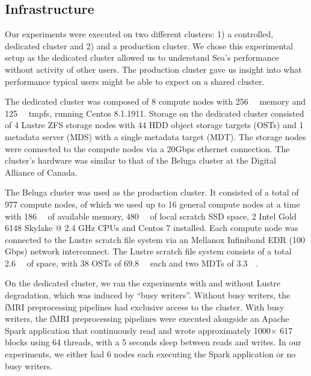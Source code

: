 \documentclass[fleqn,10pt]{wlscirep}
\begin{document}
    
    \subsection{Infrastructure}
    
    Our experiments were executed on two different clusters: 1) a controlled, dedicated cluster
    and 2) and a production cluster. We chose this experimental setup as the dedicated
    cluster allowed us to understand Sea's performance without activity of other users.
    The production cluster gave us insight into what performance typical users might
    be able to expect on a shared cluster.

    The dedicated cluster was composed of 8
    compute nodes with \SI{256}{\gibi\byte} memory and \SI{125}{\gibi\byte}
    tmpfs, running Centos 8.1.1911.
    Storage on the dedicated cluster consisted of 4 Lustre ZFS storage nodes with 44
    HDD object storage targets (OSTs) and 1 metadata server (MDS) with a single
    metadata target (MDT). The storage nodes were connected to the compute nodes
    via a 20Gbps ethernet connection. The cluster's hardware was similar to that
    of the Beluga cluster at the Digital Alliance of Canada.
    
    The Beluga cluster was used as the production cluster.
    It consisted of a total of 977 compute nodes, of which we
    used up to 16 general compute nodes at a time with \SI{186}{\gibi\byte} of
    available memory, \SI{480}{\gibi\byte} of local scratch SSD space, 2 Intel
    Gold 6148 Skylake @ 2.4 GHz CPUs and Centos 7 installed. Each compute node
    was connected to the Lustre scratch file system via an Mellanox Infiniband
    EDR (100 Gbps) network interconnect. The Lustre scratch file system consists
    of a total \SI{2.6}{\pebi\byte} of space, with 38 OSTs of
    \SI{69.8}{\tebi\byte} each and two MDTs of \SI{3.3}{\tebi\byte}.

    On the dedicated cluster, we ran the experiments with and without
    Lustre degradation, which was induced by ``busy writers''. Without busy
    writers, the fMRI preprocessing pipelines had exclusive access to the
    cluster. With busy writers, the fMRI preprocessing pipelines were executed
    alongside an Apache Spark application that continuously read and wrote approximately
    1000$\times$ \SI{617}{\mebi\byte} blocks using 64 threads, with a 5 seconds sleep between reads
    and writes. In our experiments, we either had 6 nodes each executing the
    Spark application or no busy writers.
\end{document}
